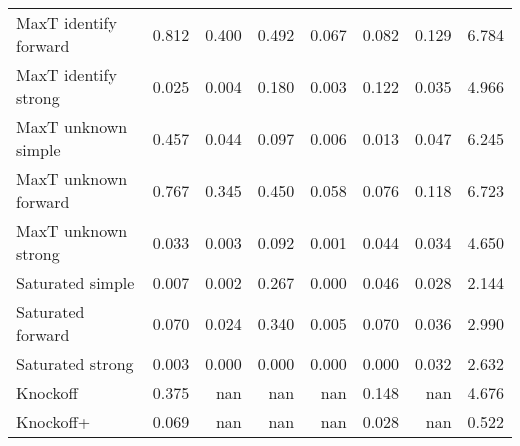 \begin{tabular}{lrrrrrrr}
MaxT identify forward &                0.812 &                       0.400 &                                           0.492 &                      0.067 &                       0.082 &                                          0.129 &                   6.784 \\
MaxT identify strong  &                0.025 &                       0.004 &                                           0.180 &                      0.003 &                       0.122 &                                          0.035 &                   4.966 \\
MaxT unknown simple   &                0.457 &                       0.044 &                                           0.097 &                      0.006 &                       0.013 &                                          0.047 &                   6.245 \\
MaxT unknown forward  &                0.767 &                       0.345 &                                           0.450 &                      0.058 &                       0.076 &                                          0.118 &                   6.723 \\
MaxT unknown strong   &                0.033 &                       0.003 &                                           0.092 &                      0.001 &                       0.044 &                                          0.034 &                   4.650 \\
Saturated simple      &                0.007 &                       0.002 &                                           0.267 &                      0.000 &                       0.046 &                                          0.028 &                   2.144 \\
Saturated forward     &                0.070 &                       0.024 &                                           0.340 &                      0.005 &                       0.070 &                                          0.036 &                   2.990 \\
Saturated strong      &                0.003 &                       0.000 &                                           0.000 &                      0.000 &                       0.000 &                                          0.032 &                   2.632 \\
Knockoff              &                0.375 &                         nan &                                             nan &                        nan &                       0.148 &                                            nan &                   4.676 \\
Knockoff+             &                0.069 &                         nan &                                             nan &                        nan &                       0.028 &                                            nan &                   0.522 \\
\bottomrule
\end{tabular}
